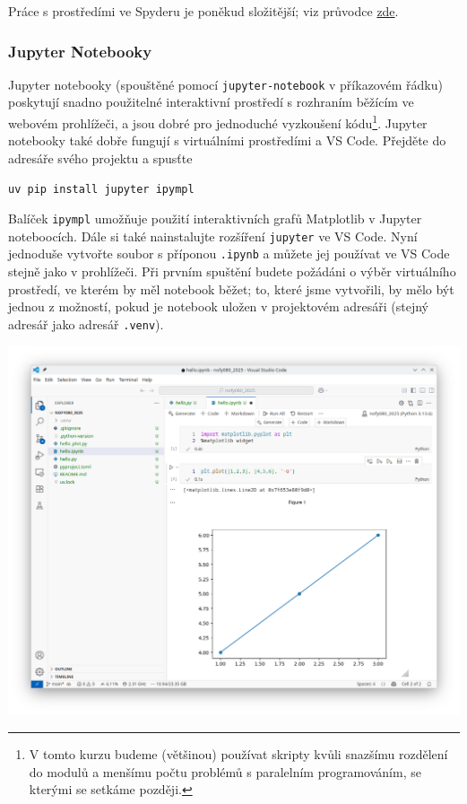 Práce s prostředími ve Spyderu je poněkud složitější; viz průvodce \href{https://github.com/spyder-ide/spyder/wiki/Working-with-packages-and-environments-in-Spyder#working-with-other-environments-and-python-installations}{zde}.

\subsubsection{Jupyter Notebooky}
Jupyter notebooky (spouštěné pomocí \verb|jupyter-notebook| v příkazovém řádku) poskytují snadno použitelné interaktivní prostředí s rozhraním běžícím ve webovém prohlížeči, a jsou dobré pro jednoduché vyzkoušení kódu\footnote{V tomto kurzu budeme (většinou) používat skripty kvůli snazšímu rozdělení do modulů a menšímu počtu problémů s paralelním programováním, se kterými se setkáme později.}. Jupyter notebooky také dobře fungují s virtuálními prostředími a VS Code. Přejděte do adresáře svého projektu a spusťte
\begin{lstlisting}
uv pip install jupyter ipympl
\end{lstlisting}
Balíček \verb|ipympl| umožňuje použití interaktivních grafů Matplotlib v Jupyter noteboocích. Dále si také nainstalujte rozšíření \verb|jupyter| ve VS Code. Nyní jednoduše vytvořte soubor s příponou \verb|.ipynb| a můžete jej používat ve VS Code stejně jako v prohlížeči. Při prvním spuštění budete požádáni o výběr virtuálního prostředí, ve kterém by měl notebook běžet; to, které jsme vytvořili, by mělo být jednou z možností, pokud je notebook uložen v projektovém adresáři (stejný adresář jako adresář \verb|.venv|).

\begin{center}
    \includegraphics[width=0.9\linewidth]{vscode_jupyter.png}
\end{center}